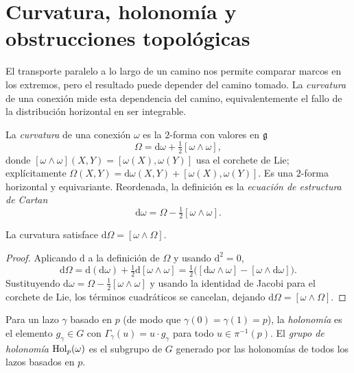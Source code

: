 \section{Curvatura, holonom\'ia y obstrucciones topol\'ogicas}
\label{sec:gauge:curvature}

El transporte paralelo a lo largo de un camino nos permite comparar marcos en los
extremos, pero el resultado puede depender del camino tomado. La
\emph{curvatura} de una conexi\'on mide esta dependencia del camino,
equivalentemente el fallo de la distribuci\'on horizontal en ser integrable.

\begin{definition}
\label{def:gauge:curvature}
La \emph{curvatura} de una conexi\'on $\omega$ es la $2$-forma con valores en
$\mathfrak{g}$
\[
  \Omega = \mathrm{d}\omega + \tfrac{1}{2}[\omega \wedge \omega],
\]
donde $[\omega \wedge \omega](X, Y) = [\omega(X), \omega(Y)]$ usa el corchete de
Lie; expl\'icitamente $\Omega(X, Y) = \mathrm{d}\omega(X, Y) + [\omega(X),
\omega(Y)]$. Es una $2$-forma horizontal y equivariante. Reordenada, la
definici\'on es la \emph{ecuaci\'on de estructura de Cartan}
\[
  \mathrm{d}\omega = \Omega - \tfrac{1}{2}[\omega \wedge \omega].
\]
\end{definition}

\begin{theorem}
\label{thm:gauge:bianchi}
La curvatura satisface $\mathrm{d}\Omega = [\omega \wedge \Omega]$.
\end{theorem}

\begin{proof}
Aplicando $\mathrm{d}$ a la definici\'on de $\Omega$ y usando $\mathrm{d}^2 = 0$,
\[
  \mathrm{d}\Omega = \mathrm{d}(\mathrm{d}\omega) + \tfrac{1}{2}\mathrm{d}[\omega
  \wedge \omega] = \tfrac{1}{2}\big([\mathrm{d}\omega \wedge \omega] - [\omega
  \wedge \mathrm{d}\omega]\big).
\]
Sustituyendo $\mathrm{d}\omega = \Omega - \tfrac{1}{2}[\omega \wedge \omega]$ y
usando la identidad de Jacobi para el corchete de Lie, los t\'erminos
cuadr\'aticos se cancelan, dejando $\mathrm{d}\Omega = [\omega \wedge \Omega]$.
\end{proof}

\begin{definition}[Holonom\'ia]
\label{def:gauge:holonomy}
Para un lazo $\gamma$ basado en $p$ (de modo que $\gamma(0) = \gamma(1) = p$), la
\emph{holonom\'ia} es el elemento $g_\gamma \in G$ con $\Gamma_\gamma(u) = u \cdot
g_\gamma$ para todo $u \in \pi^{-1}(p)$. El \emph{grupo de holonom\'ia}
$\operatorname{Hol}_p(\omega)$ es el subgrupo de $G$ generado por las holonom\'ias de todos los
lazos basados en $p$.
\end{definition}


